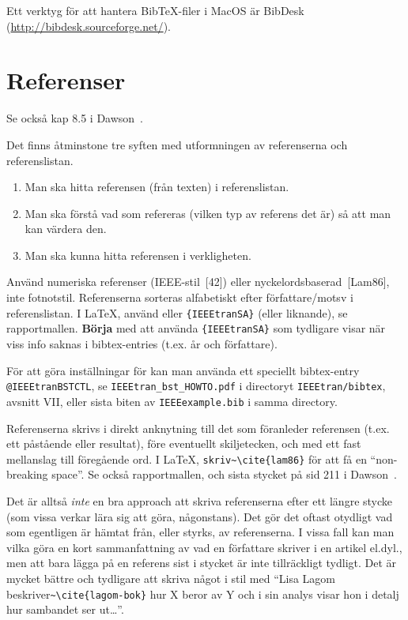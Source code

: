 \documentclass[a4paper,12pt]{article}
\begin{document}
Ett verktyg för att hantera BibTeX-filer i MacOS är BibDesk (\url{http://bibdesk.sourceforge.net/}).

\section{Referenser}
\label{sec:referenser}

Se också kap 8.5 i Dawson~\cite{dawson:projects-in-computing}.

Det finns åtminstone tre syften med utformningen av referenserna och referenslistan.
\begin{enumerate}
\item Man ska hitta referensen (från texten) i referenslistan.
\item Man ska förstå vad som refereras (vilken typ av referens det är) så att man kan värdera den.
\item Man ska kunna hitta referensen i verkligheten.
\end{enumerate}

Använd numeriska referenser (IEEE-stil~[42]) eller nyckelordsbaserad~[Lam86], inte fotnotstil. Referenserna sorteras alfabetiskt efter författare/motsv i referenslistan. I LaTeX, använd \verb|| eller \verb|{IEEEtranSA}| (eller liknande), se rapportmallen. \textbf{Börja} med att använda \verb|{IEEEtranSA}| som tydligare visar när viss info saknas i bibtex-entries (t.ex. år och författare).

För att göra inställningar för \verb|| kan man använda ett speciellt bibtex-entry \texttt{@IEEEtranBSTCTL}, se \texttt{IEEEtran\_bst\_HOWTO.pdf} i directoryt \texttt{IEEEtran/bibtex}, avsnitt VII, eller sista biten av \texttt{IEEEexample.bib} i samma directory.

Referenserna skrivs i direkt anknytning till det som föranleder referensen (t.ex. ett påstående eller resultat), före eventuellt skiljetecken, och med ett fast mellanslag till föregående ord. I La\TeX, \verb|skriv~\cite{lam86}| för att få en ``non-breaking space''. Se också rapportmallen, och sista stycket på sid 211 i Dawson~\cite{dawson:projects-in-computing}. 

Det är alltså \emph{inte} en bra approach att skriva referenserna efter ett längre stycke (som vissa verkar lära sig att göra, någonstans). Det gör det oftast otydligt vad som egentligen är hämtat från, eller styrks, av referenserna. I vissa fall kan man vilka göra en kort sammanfattning av vad en författare skriver i en artikel el.dyl., men att bara lägga på en referens sist i stycket är inte tillräckligt tydligt. Det är mycket bättre och tydligare att skriva något i stil med ``Lisa Lagom beskriver\verb|~\cite{lagom-bok}| hur X beror av Y och i sin analys visar hon i detalj hur sambandet ser ut\ldots''.
\end{document}
